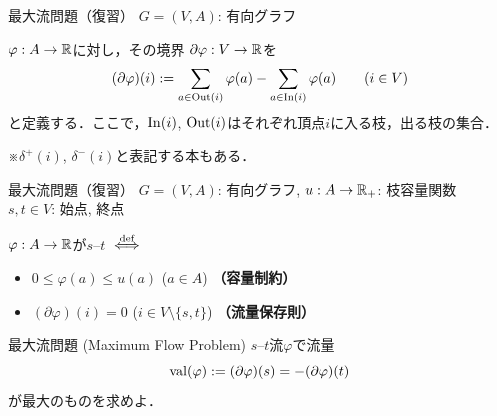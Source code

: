 \documentclass[14pt,aspectratio=169,xcolor=dvipsnames,table,onlytextwidth,dvipdfmx]{beamer}
\begin{document}
\begin{frame}{最大流問題（復習）}
    $G = (V, A)$: 有向グラフ 

    \begin{definition}
        $\varphi: A \to \mathbb{R}$に対し，その\alert{境界} $\partial \varphi: V \to \mathbb{R}$を
        \[
            (\partial\varphi)(i) := \sum_{a \in \operatorname{Out}(i)} \varphi(a) - \sum_{a \in \operatorname{In}(i)} \varphi(a)  \qquad (i \in V)
        \]
        と定義する．ここで，$\operatorname{In}(i)$, $\operatorname{Out}(i)$はそれぞれ頂点$i$に入る枝，出る枝の集合．

        {\hfill\footnotesize ※$\delta^+(i)$, $\delta^-(i)$と表記する本もある．}
    \end{definition}
\end{frame}

\begin{frame}{最大流問題（復習）}
    $G = (V, A)$: 有向グラフ, $u: A \to \mathbb{R}_+$: 枝容量関数 \\
    $s, t \in V$: 始点, 終点 

    \begin{definition}[$s$--$t$流]
        $\varphi: A \to \mathbb{R}$が\alert{$s$--$t$} $\overset{\text{def}}{\iff}$
        \begin{itemize}
            \item $0 \leq \varphi(a) \leq u(a)$ \qquad ($a \in A$) \hfill \textbf{（容量制約）} 
            \item $(\partial\varphi)(i) = 0$ \qquad ($i \in V \setminus \{s, t\}$) \hfill \textbf{（流量保存則）}
        \end{itemize}
    \end{definition}

    \pause
    \begin{block}{最大流問題 (Maximum Flow Problem)}
        $s$--$t$流$\varphi$で\alert{流量} \[
            \operatorname{val}(\varphi) := (\partial\varphi)(s) = -(\partial\varphi)(t) 
        \]
        が最大のものを求めよ．
    \end{block}
\end{frame}



\end{document}
